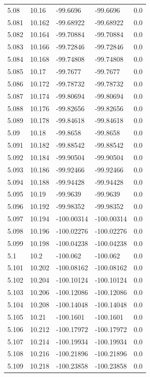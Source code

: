 \begin{tabular}{lllll}
5.08 & 10.16 & -99.6696 & -99.6696 & 0.0 \\
5.081 & 10.162 & -99.68922 & -99.68922 & 0.0 \\
5.082 & 10.164 & -99.70884 & -99.70884 & 0.0 \\
5.083 & 10.166 & -99.72846 & -99.72846 & 0.0 \\
5.084 & 10.168 & -99.74808 & -99.74808 & 0.0 \\
5.085 & 10.17 & -99.7677 & -99.7677 & 0.0 \\
5.086 & 10.172 & -99.78732 & -99.78732 & 0.0 \\
5.087 & 10.174 & -99.80694 & -99.80694 & 0.0 \\
5.088 & 10.176 & -99.82656 & -99.82656 & 0.0 \\
5.089 & 10.178 & -99.84618 & -99.84618 & 0.0 \\
5.09 & 10.18 & -99.8658 & -99.8658 & 0.0 \\
5.091 & 10.182 & -99.88542 & -99.88542 & 0.0 \\
5.092 & 10.184 & -99.90504 & -99.90504 & 0.0 \\
5.093 & 10.186 & -99.92466 & -99.92466 & 0.0 \\
5.094 & 10.188 & -99.94428 & -99.94428 & 0.0 \\
5.095 & 10.19 & -99.9639 & -99.9639 & 0.0 \\
5.096 & 10.192 & -99.98352 & -99.98352 & 0.0 \\
5.097 & 10.194 & -100.00314 & -100.00314 & 0.0 \\
5.098 & 10.196 & -100.02276 & -100.02276 & 0.0 \\
5.099 & 10.198 & -100.04238 & -100.04238 & 0.0 \\
5.1 & 10.2 & -100.062 & -100.062 & 0.0 \\
5.101 & 10.202 & -100.08162 & -100.08162 & 0.0 \\
5.102 & 10.204 & -100.10124 & -100.10124 & 0.0 \\
5.103 & 10.206 & -100.12086 & -100.12086 & 0.0 \\
5.104 & 10.208 & -100.14048 & -100.14048 & 0.0 \\
5.105 & 10.21 & -100.1601 & -100.1601 & 0.0 \\
5.106 & 10.212 & -100.17972 & -100.17972 & 0.0 \\
5.107 & 10.214 & -100.19934 & -100.19934 & 0.0 \\
5.108 & 10.216 & -100.21896 & -100.21896 & 0.0 \\
5.109 & 10.218 & -100.23858 & -100.23858 & 0.0 \\

\end{tabular}
